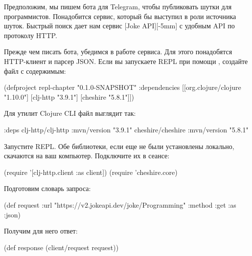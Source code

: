 \def\urljokeapi{https://jokeapi.dev/}

Предположим, мы пишем бота для Telegram, чтобы публиковать шутки для программистов. Понадобится сервис, который бы выступил в роли источника шуток. Быстрый поиск дает нам сервис \footurl{Joke API}{\urljokeapi}[Joke API][-5mm] с удобным API по протоколу HTTP.

Прежде чем писать бота, убедимся в работе сервиса. Для этого понадобятся HTTP-клиент и парсер JSON. Если вы запускаете REPL при помощи , создайте файл  с содержимым:

\begin{english}
  \begin{clojure}
(defproject repl-chapter "0.1.0-SNAPSHOT"
  :dependencies [[org.clojure/clojure "1.10.0"]
                 [clj-http "3.9.1"]
                 [cheshire "5.8.1"]])
  \end{clojure}
\end{english}

Для утилит Clojure CLI файл  выглядит так:

\begin{english}
  \begin{clojure}
{:deps
 {clj-http/clj-http {:mvn/version "3.9.1"}
  cheshire/cheshire {:mvn/version "5.8.1"}}}
  \end{clojure}
\end{english}

Запустите REPL. Обе библиотеки, если еще не были установлены локально, скачаются на ваш компьютер. Подключите их в сеансе:

\begin{english}
  \begin{clojure}
(require '[clj-http.client :as client])
(require 'cheshire.core)
  \end{clojure}
\end{english}

Подготовим словарь запроса:

\begin{english}
  \begin{clojure}
(def request
  {:url "https://v2.jokeapi.dev/joke/Programming"
   :method :get
   :as :json})
  \end{clojure}
\end{english}

Получим для него ответ:

\begin{english}
  \begin{clojure}
(def response
  (client/request request))
  \end{clojure}
\end{english}

